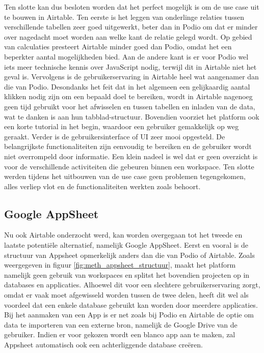 Ten slotte kan dus besloten worden dat het perfect mogelijk is om de use case uit te bouwen in Airtable. Ten eerste is het leggen van onderlinge relaties tussen verschillende tabellen zeer goed uitgewerkt, beter dan in Podio om dat er minder over nagedacht moet worden aan welke kant de relatie gelegd wordt. Op gebied van calculaties presteert Airtable minder goed dan Podio, omdat het een beperkter aantal mogelijkheden bied. Aan de andere kant is er voor Podio wel iets meer technische kennis over JavaScript nodig, terwijl dit in Airtable niet het geval is. Vervolgens is de gebruikerservaring in Airtable heel wat aangenamer dan die van Podio. Desondanks het feit dat in het algemeen een gelijkaardig aantal klikken nodig zijn om een bepaald doel te bereiken, wordt in Airtable nagenoeg geen tijd gebruikt voor het afwisselen en tussen tabellen en inladen van de data, wat te danken is aan hun tabblad-structuur. Bovendien voorziet het platform ook een korte tutorial in het begin, waardoor een gebruiker gemakkelijk op weg geraakt. Verder is de gebruikersinterface of UI zeer mooi opgesteld. De belangrijkste functionaliteiten zijn eenvoudig te bereiken en de gebruiker wordt niet overrompeld door informatie. Een klein nadeel is wel dat er geen overzicht is voor de verschillende activiteiten die gebeuren binnen een workspace. Ten slotte werden tijdens het uitbouwen van de use case geen problemen tegengekomen, alles verliep vlot en de functionaliteiten werkten zoals behoort. \\

\newpage



\subsection{Google AppSheet} 

Nu ook Airtable onderzocht werd, kan worden overgegaan tot het tweede en laatste potentiële alternatief, namelijk Google AppSheet. Eerst en vooral is de structuur van Appsheet opmerkelijk anders dan die van Podio of Airtable. Zoals weergegeven in figuur \ref{fig:meth_appsheet_structuur}, maakt het platform namelijk geen gebruik van workspaces en splitst het bovendien projecten op in databases en applicaties. Alhoewel dit voor een slechtere gebruikerservaring zorgt, omdat er vaak moet afgewisseld worden tussen de twee delen, heeft dit wel als voordeel dat een enkele database gebruikt kan worden door meerdere applicaties. Bij het aanmaken van een App is er net zoals bij Podio en Airtable de optie om data te importeren van een externe bron, namelijk de Google Drive van de gebruiker. Indien er voor gekozen wordt een blanco app aan te maken, zal Appsheet automatisch ook een achterliggende database creëren. \\

